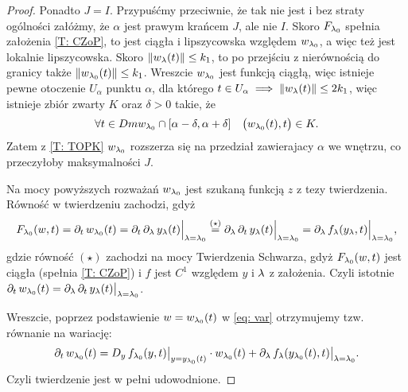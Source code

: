 \begin{proof}
  Ponadto $ J = I $. Przypuśćmy przeciwnie, że tak nie jest i bez straty ogólności załóżmy, że $\alpha$ jest prawym
  krańcem $J$, ale nie $I$. Skoro $F_{\l_0}$ spełnia założenia \ref{T: CZoP}, to jest ciągła i lipszycowska względem $w_{\l_0}$, a więc też jest lokalnie lipszycowska. Skoro $\norm{ w_\l(t) } \le k_1$, to po przejściu z nierównością do granicy także $\norm{ w_{\l_0}(t) } \le k_1$. Wreszcie $w_{\l_0}$ jest funkcją ciągłą, więc istnieje pewne otoczenie $U_\alpha$ punktu $\alpha$, dla
  którego $ t \in U_\alpha \implies \norm{ w_\l(t) } \le 2k_1$, więc istnieje zbiór zwarty $K$ oraz $\delta > 0$ takie, że 
%
  \begin{equation*}
    \forall t\in Dm w_{\l_0} \cap [\alpha - \delta, \alpha + \delta] \quad \big( w_{\l_0}(t), t \big) \in K.
  \end{equation*}
%
  Zatem z \ref{T: TOPK} $w_{\l_0}$ rozszerza się na przedział zawierajacy $\alpha$ we wnętrzu, co przeczyłoby maksymalności $J$.
  
  Na mocy powyższych rozważań $w_{\l_0}$ jest szukaną funkcją $z$ z tezy twierdzenia. Równość w twierdzeniu zachodzi, gdyż
%  
  \begin{align*}
  	F_{\l_0}(w, t) = \pd{t} w_{\l_0}(t) = \pd{t} \pd{\l} y_\l(t) \Big\vert_{ \l = \l_0 } \overset{(\star)}{ = } 
  	\pd{\l} \pd{t} y_\l(t) \Big\vert_{ \l = \l_0 } = \pd{\l} f_\l(y_\l, t) \Big\vert_{ \l = \l_0 },
  \end{align*} 
%
  gdzie równość $(\star)$ zachodzi na mocy Twierdzenia Schwarza, gdyż $F_{\l_0}(w, t)$ jest ciągła (spełnia \ref{T: CZoP}) i
  $f$ jest $C^1$ względem $y$ i $\l$ z założenia. Czyli istotnie $\pd{t} w_{\l_0}(t) = \pd{\l } \pd{t} y_\l (t) \big\vert_{ \l = \l_0 }$.
  
  Wreszcie, poprzez podstawienie $w = w_{\l_0}(t)$ w \eqref{eq: var} otrzymujemy tzw. równanie na wariację:
%
  \begin{equation*}
  	\pd{t} w_{\l_0}(t) =  D_y \, f_{\l_0} (y, t) \big\vert_{ y = y_{\l_0}(t) } \cdot w_{\l_0}(t) + \pd{ \l } f_{\l}( y_{\l_0}(t), t) 
  	\big\vert_{ \l = \l_0 }.
  \end{equation*} 
%
  Czyli twierdzenie jest w pełni udowodnione. \qedhere
\end{proof}

%

